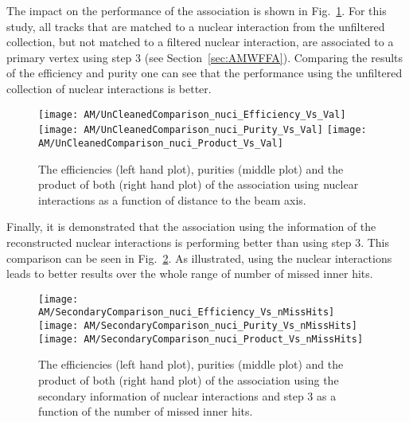 The impact on the performance of the association is shown in Fig.~\ref{plot:AMWFSVnuciEffAndPurRT}. For this study, all tracks that are matched to a nuclear interaction from the unfiltered collection, but not matched to a filtered nuclear interaction, are associated to a primary vertex using step 3 (see Section~\ref{sec:AMWFFA}). Comparing the results of the efficiency and purity one can see that the performance using the unfiltered collection of nuclear interactions is better.

\begin{figure}[!ht]
    \centering
    \texttt{[image: AM/UnCleanedComparison\_nuci\_Efficiency\_Vs\_Val]}
    \texttt{[image: AM/UnCleanedComparison\_nuci\_Purity\_Vs\_Val]}
    \texttt{[image: AM/UnCleanedComparison\_nuci\_Product\_Vs\_Val]}
    \caption[Efficiencies, purities and their product of the association using different nuclear interaction collections as a function of distance to the beam axis]{The efficiencies (left hand plot), purities (middle plot) and the product of both (right hand plot) of the association using nuclear interactions as a function of distance to the beam axis. \label{plot:AMWFSVnuciEffAndPurRT}}
\end{figure}

Finally, it is demonstrated that the association using the information of the reconstructed nuclear interactions is performing better than using step 3. This comparison can be seen in Fig.~\ref{plot:AMWFSVnuciEffAndPurVsFA}. As illustrated, using the nuclear interactions leads to better results over the whole range of number of missed inner hits.

\begin{figure}[!ht]
    \centering
    \texttt{[image: AM/SecondaryComparison\_nuci\_Efficiency\_Vs\_nMissHits]}
    \texttt{[image: AM/SecondaryComparison\_nuci\_Purity\_Vs\_nMissHits]}
    \texttt{[image: AM/SecondaryComparison\_nuci\_Product\_Vs\_nMissHits]}
    \caption[Efficiencies, purities and their product of the association using nuclear interactions \vs{} step 3 as a function of missed inner hits]{The efficiencies (left hand plot), purities (middle plot) and the product of both (right hand plot) of the association using the secondary information of nuclear interactions and step 3 as a function of the number of missed inner hits.\label{plot:AMWFSVnuciEffAndPurVsFA}}
\end{figure}

